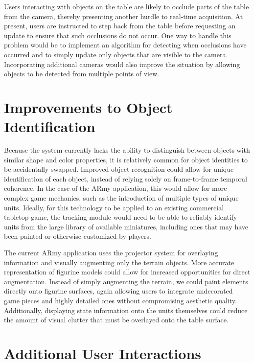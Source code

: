 \documentclass{thesis}
\begin{document}
Users interacting with objects on the table are likely to occlude parts of the table from the camera, thereby presenting another hurdle to real-time acquisition. At present, users are instructed to step back from the table before requesting an update to ensure that such occlusions do not occur. One way to handle this problem would be to implement an algorithm for detecting when occlusions have occurred and to simply update only objects that are visible to the camera. Incorporating additional cameras would also improve the situation by allowing objects to be detected from multiple points of view.

\section{Improvements to Object Identification }

Because the system currently lacks the ability to distinguish between objects with similar shape and color properties, it is relatively common for object identities to be accidentally swapped. Improved object recognition could allow for unique identification of each object, instead of relying solely on frame-to-frame temporal coherence. In the case of the ARmy application, this would allow for more complex game mechanics, such as the introduction of multiple types of unique units. Ideally, for this technology to be applied to an existing commercial tabletop game, the tracking module would need to be able to reliably identify units from the large library of available miniatures, including ones that may have been painted or otherwise customized by players.

The current ARmy application uses the projector system for overlaying information and visually augmenting only the terrain objects. More accurate representation of figurine models could allow for increased opportunities for direct augmentation. Instead of simply augmenting the terrain, we could paint elements directly onto figurine surfaces, again allowing users to integrate undecorated game pieces and highly detailed ones without compromising aesthetic quality. Additionally, displaying state information onto the units themselves could reduce the amount of visual clutter that must be overlayed onto the table surface.

\section{Additional User Interactions }
\end{document}

